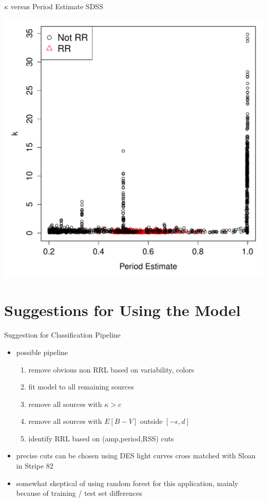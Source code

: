 \documentclass[12pt]{beamer}
\begin{document}
\begin{frame}{$\kappa$ versus Period Estimate SDSS}

  \begin{center}
  \includegraphics[scale=0.45]{figs/kappa_period_sdss.pdf}
  \end{center}
  
\end{frame}


\section{Suggestions for Using the Model}

\begin{frame}{Suggestion for Classification Pipeline}
  \begin{itemize}
    \item possible pipeline
  \begin{enumerate}
  \item remove obvious non RRL based on variability, colors
  \item fit model to all remaining sources
  \item remove all sources with $\kappa > c$
  \item remove all sources with $E[B-V]$ outside $[-\epsilon,d]$ 
  \item identify RRL based on (amp,period,RSS) cuts
  \end{enumerate}
  \item precise cuts can be chosen using DES light curves cross matched with Sloan in Stripe 82
  \item somewhat skeptical of using random forest for this application, mainly because of training / test set differences
  \end{itemize}
  


\end{frame}
\end{document}
